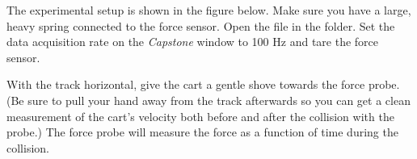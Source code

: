 The experimental setup is shown in the figure below.
Make sure you have a large, heavy spring connected to the force sensor.  
Open the file  in the \filename{\coursefolder} folder. 
Set the data acquisition rate 
on the {\it Capstone} window to 100 Hz and tare the force sensor.

With the track horizontal, give the cart a gentle shove towards the force probe.  (Be sure to pull your hand away from the track afterwards so you can get a clean measurement of the cart's velocity both before and after the collision with the probe.)
The force probe will measure the force as a function of time during the collision. 


